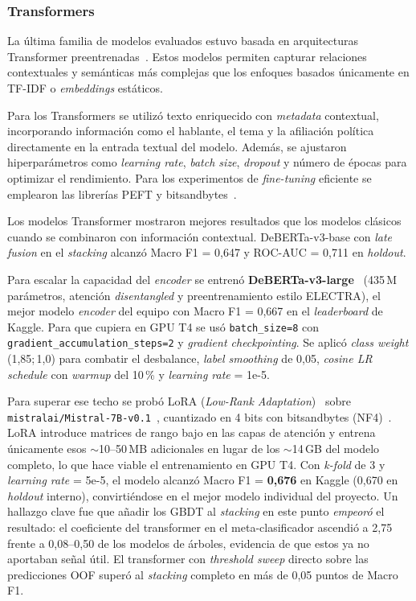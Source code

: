 \documentclass[12pt,a4paper]{article}
\begin{document}
\subsubsection{Transformers}

La última familia de modelos evaluados estuvo basada en arquitecturas Transformer preentrenadas~\cite{hf_transformers}. Estos modelos permiten capturar relaciones contextuales y semánticas más complejas que los enfoques basados únicamente en TF-IDF o \emph{embeddings} estáticos.

Para los Transformers se utilizó texto enriquecido con \emph{metadata} contextual, incorporando información como el hablante, el tema y la afiliación política directamente en la entrada textual del modelo. Además, se ajustaron hiperparámetros como \emph{learning rate}, \emph{batch size}, \emph{dropout} y número de épocas para optimizar el rendimiento. Para los experimentos de \emph{fine-tuning} eficiente se emplearon las librerías PEFT y bitsandbytes~\cite{peft,bitsandbytes}.

Los modelos Transformer mostraron mejores resultados que los modelos clásicos cuando se combinaron con información contextual. DeBERTa-v3-base con \emph{late fusion} en el \emph{stacking} alcanzó Macro F1 = 0,647 y ROC-AUC = 0,711 en \emph{holdout}.

Para escalar la capacidad del \emph{encoder} se entrenó \textbf{DeBERTa-v3-large}~\cite{deberta} (435\,M parámetros, atención \emph{disentangled} y preentrenamiento estilo ELECTRA), el mejor modelo \emph{encoder} del equipo con Macro F1 = 0,667 en el \emph{leaderboard} de Kaggle. Para que cupiera en GPU T4 se usó \texttt{batch\_size=8} con \texttt{gradient\_accumulation\_steps=2} y \emph{gradient checkpointing}. Se aplicó \emph{class weight} (1,85;\,1,0) para combatir el desbalance, \emph{label smoothing} de 0,05, \emph{cosine LR schedule} con \emph{warmup} del 10\,\% y \emph{learning rate} = 1e-5.

Para superar ese techo se probó LoRA (\emph{Low-Rank Adaptation})~\cite{peft} sobre \texttt{mistralai/Mistral-7B-v0.1}~\cite{mistral}, cuantizado en 4 bits con bitsandbytes (NF4)~\cite{bitsandbytes}. LoRA introduce matrices de rango bajo en las capas de atención y entrena únicamente esos $\sim$10--50\,MB adicionales en lugar de los $\sim$14\,GB del modelo completo, lo que hace viable el entrenamiento en GPU T4. Con \emph{k-fold} de 3 y \emph{learning rate} = 5e-5, el modelo alcanzó Macro F1 = \textbf{0,676} en Kaggle (0,670 en \emph{holdout} interno), convirtiéndose en el mejor modelo individual del proyecto. Un hallazgo clave fue que añadir los GBDT al \emph{stacking} en este punto \emph{empeoró} el resultado: el coeficiente del transformer en el meta-clasificador ascendió a 2,75 frente a 0,08--0,50 de los modelos de árboles, evidencia de que estos ya no aportaban señal útil. El transformer con \emph{threshold sweep} directo sobre las predicciones OOF superó al \emph{stacking} completo en más de 0,05 puntos de Macro F1.
\end{document}
